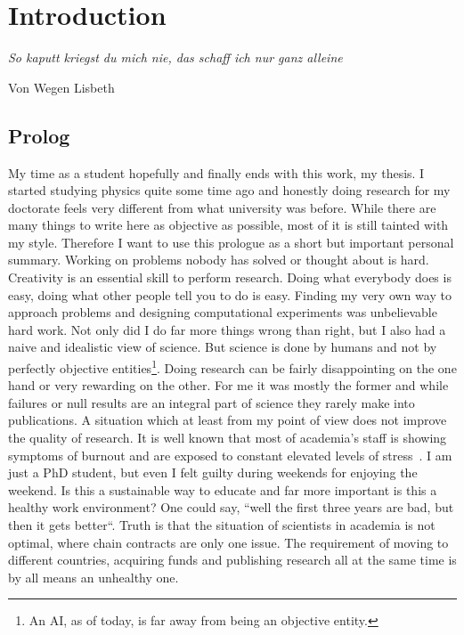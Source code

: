 \chapter{Introduction}
\label{chapter:intro}
\epigraph{\textit{So kaputt kriegst du mich nie, das schaff ich nur ganz alleine}}{Von Wegen Lisbeth}

\section{Prolog}
\label{sec:prolog}
My time as a student hopefully and finally ends with this work, my thesis.
I started studying physics quite some time ago and honestly doing research for my doctorate feels very different from what university was before.
While there are many things to write here as objective as possible, most of it is still tainted with my style.
Therefore I want to use this prologue as a short but important personal summary.
Working on problems nobody has solved or thought about is hard.
Creativity is an essential skill to perform research.
Doing what everybody does is easy, doing what other people tell you to do is easy.
Finding my very own way to approach problems and designing computational experiments was unbelievable hard work. 
Not only did I do far more things wrong than right, but I also had a naive and idealistic view of science.
But science is done by humans and not by perfectly objective entities\footnote{An AI, as of today, is far away from being an objective entity.}.
Doing research can be fairly disappointing on the one hand or very rewarding on the other.
For me it was mostly the former and while failures or null results are an integral part of science they rarely make into publications.
A situation which at least from my point of view does not improve the quality of research.
It is well known that most of academia's staff is showing symptoms of burnout and are exposed to constant elevated levels of stress~\cite{gewin2021pandemic, bilge2006examining, henny2014prevalence, watts2011burnout, satinsky2021systematic}.
I am just a PhD student, but even I felt guilty during weekends for enjoying the weekend.
Is this a sustainable way to educate and far more important is this a healthy work environment?
One could say, ``well the first three years are bad, but then it gets better``. 
Truth is that the situation of scientists in academia is not optimal, where chain contracts are only one issue.
The requirement of moving to different countries, acquiring funds and publishing research all at the same time is by all means an unhealthy one.

